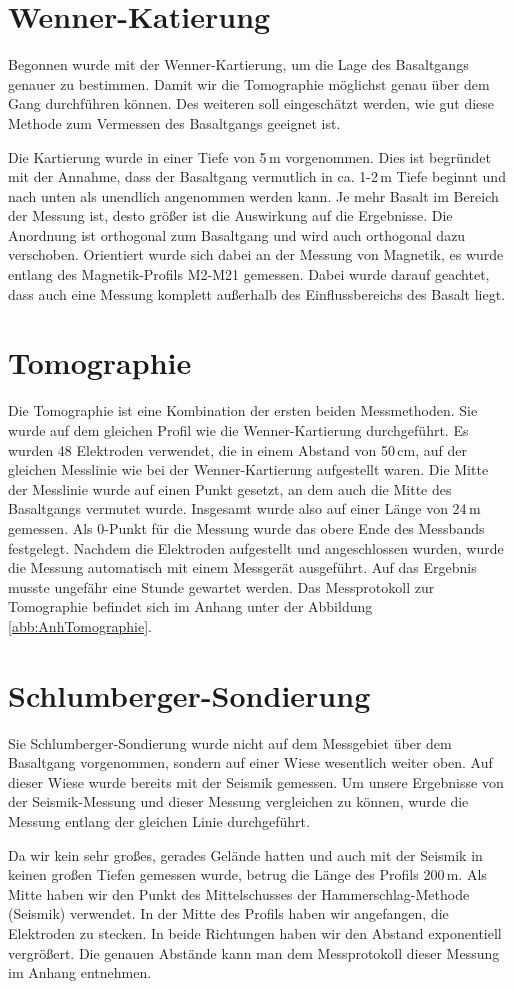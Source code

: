 \section{Wenner-Katierung}

Begonnen wurde mit der Wenner-Kartierung, um die Lage des Basaltgangs genauer zu bestimmen. Damit wir die Tomographie möglichst genau über dem Gang durchführen
können. 
Des weiteren soll eingeschätzt werden, wie gut diese Methode zum Vermessen des Basaltgangs geeignet ist.

Die Kartierung wurde in einer Tiefe von 5\,m vorgenommen. Dies ist begründet mit der Annahme, dass der Basaltgang vermutlich in ca. 1-2\,m Tiefe beginnt und nach unten 
als unendlich angenommen werden kann. Je mehr Basalt im Bereich der Messung ist, desto größer ist die Auswirkung auf die Ergebnisse.
Die Anordnung ist orthogonal zum Basaltgang und wird auch orthogonal dazu verschoben. Orientiert wurde sich dabei an der Messung von Magnetik, es wurde 
entlang des Magnetik-Profils M2-M21 gemessen. Dabei wurde darauf geachtet, dass auch eine Messung komplett außerhalb 
des Einflussbereichs des Basalt liegt.

\section{Tomographie}

Die Tomographie ist eine Kombination der ersten beiden Messmethoden. Sie wurde auf dem gleichen Profil wie die Wenner-Kartierung durchgeführt.
Es wurden 48 Elektroden verwendet, die in einem Abstand von 50\,cm, auf der gleichen Messlinie wie bei der Wenner-Kartierung aufgestellt waren. 
Die Mitte der Messlinie wurde auf einen Punkt gesetzt, an dem auch die Mitte des Basaltgangs vermutet wurde. Insgesamt wurde also auf einer Länge von 24\,m gemessen.
Als 0-Punkt für die Messung wurde das obere Ende des Messbands festgelegt.
Nachdem die Elektroden aufgestellt und angeschlossen wurden, wurde die Messung automatisch mit einem Messgerät ausgeführt. Auf das Ergebnis musste ungefähr 
eine Stunde gewartet werden. Das Messprotokoll zur Tomographie befindet sich im Anhang unter der Abbildung \ref{abb:AnhTomographie}.

\section{Schlumberger-Sondierung}

Sie Schlumberger-Sondierung wurde nicht auf dem Messgebiet über dem Basaltgang vorgenommen, sondern auf einer Wiese wesentlich weiter oben. Auf dieser Wiese wurde 
bereits mit der Seismik gemessen. Um unsere Ergebnisse von der Seismik-Messung und dieser Messung vergleichen zu können, wurde die Messung entlang der gleichen
Linie durchgeführt.

Da wir kein sehr großes, gerades Gelände hatten und auch mit der Seismik in keinen großen Tiefen gemessen wurde, betrug die Länge des Profils 200\,m. Als Mitte 
haben wir den Punkt des Mittelschusses der Hammerschlag-Methode (Seismik) verwendet.
In der Mitte des Profils haben wir angefangen, die Elektroden zu stecken. In beide Richtungen haben wir den Abstand exponentiell vergrößert. Die genauen Abstände kann man dem Messprotokoll dieser Messung im Anhang entnehmen.